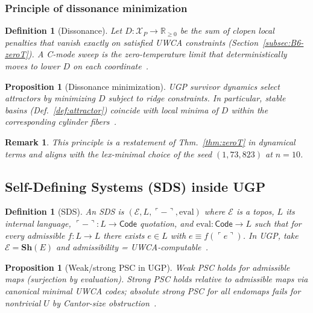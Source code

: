 \documentclass[12pt]{article}
\newtheorem{proposition}[theorem]{Proposition}
\newtheorem{definition}[theorem]{Definition}
\newtheorem{remark}[theorem]{Remark}
\numberwithin{equation}{section}
\newcommand{\R}{\mathbb{R}}
\begin{document}
\subsubsection{Principle of dissonance minimization}\label{subsec:dissonance}
\begin{definition}[Dissonance]
Let $D:\mathscr{X}_P\to\R_{\ge 0}$ be the sum of clopen local penalties that vanish exactly on satisfied UWCA constraints (Section~\ref{subsec:B6-zeroT}). A C-mode sweep is the zero-temperature limit that deterministically moves to lower $D$ on each coordinate~\cite{SpivackUGPFormalization,ugp-lean}.
\end{definition}
\begin{proposition}[Dissonance minimization]\label{prin:dissonance}
UGP survivor dynamics select attractors by minimizing $D$ subject to ridge constraints. In particular, stable basins (Def.~\ref{def:attractor}) coincide with local minima of $D$ within the corresponding cylinder fibers~\cite{SpivackUGPFormalization,ugp-lean}.
\end{proposition}
\begin{remark}
This principle is a restatement of Thm.~\ref{thm:zeroT} in dynamical terms and aligns with the lex-minimal choice of the seed $(1,73,823)$ at $n=10$.
\end{remark}

\subsection*{Self-Defining Systems (SDS) inside UGP}
\begin{definition}[SDS]\label{def:sds-compact}
An SDS is $(\mathcal{E},L,\ulcorner-\urcorner,\mathrm{eval})$ where $\mathcal{E}$ is a topos, $L$ its internal language, $\ulcorner-\urcorner:L\to\mathsf{Code}$ quotation, and $\mathrm{eval}:\mathsf{Code}\to L$ such that for every admissible $f:L\to L$ there exists $e\in L$ with $e\equiv f(\ulcorner e\urcorner)$. In UGP, take $\mathcal{E}=\mathbf{Sh}(E)$ and admissibility = UWCA-computable~\cite{SpivackUGPFormalization,ugp-lean}.
\end{definition}
\begin{proposition}[Weak/strong PSC in UGP]\label{prop:psc-compact}
Weak PSC holds for admissible maps (surjection by evaluation). Strong PSC holds relative to admissible maps via canonical minimal UWCA codes; absolute strong PSC for all endomaps fails for nontrivial $U$ by Cantor-size obstruction~\cite{SpivackUGPFormalization,ugp-lean}.
\end{proposition}
\end{document}
